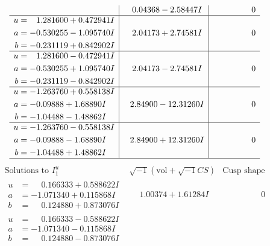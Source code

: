 \documentclass[1p]{elsarticle_modified}
\theoremstyle{definition}
\newcommand{\I}{\sqrt{-1}}
\begin{document}
$$\begin{array}{c|c|c}
 & \phantom{-}0.04368 - 2.58447 I & \phantom{-0.000000 } 0 \\ \hline\begin{aligned}
u &= \phantom{-}1.281600 + 0.472941 I \\
a &= -0.530255 - 1.095740 I \\
b &= -0.231119 + 0.842902 I\end{aligned}
 & \phantom{-}2.04173 + 2.74581 I & \phantom{-0.000000 } 0 \\ \hline\begin{aligned}
u &= \phantom{-}1.281600 - 0.472941 I \\
a &= -0.530255 + 1.095740 I \\
b &= -0.231119 - 0.842902 I\end{aligned}
 & \phantom{-}2.04173 - 2.74581 I & \phantom{-0.000000 } 0 \\ \hline\begin{aligned}
u &= -1.263760 + 0.558138 I \\
a &= -0.09888 + 1.68890 I \\
b &= -1.04488 - 1.48862 I\end{aligned}
 & \phantom{-}2.84900 - 12.31260 I & \phantom{-0.000000 } 0 \\ \hline\begin{aligned}
u &= -1.263760 - 0.558138 I \\
a &= -0.09888 - 1.68890 I \\
b &= -1.04488 + 1.48862 I\end{aligned}
 & \phantom{-}2.84900 + 12.31260 I & \phantom{-0.000000 } 0\\
 \hline 
 \end{array}$$\newpage$$\begin{array}{c|c|c}  
\text{Solutions to }I^u_{1}& \I (\text{vol} + \sqrt{-1}CS) & \text{Cusp shape}\\
 \hline 
\begin{aligned}
u &= \phantom{-}0.166333 + 0.588622 I \\
a &= -1.071340 + 0.115868 I \\
b &= \phantom{-}0.124880 + 0.873076 I\end{aligned}
 & \phantom{-}1.00374 + 1.61284 I & \phantom{-0.000000 } 0 \\ \hline\begin{aligned}
u &= \phantom{-}0.166333 - 0.588622 I \\
a &= -1.071340 - 0.115868 I \\
b &= \phantom{-}0.124880 - 0.873076 I\end{aligned}

\end{array}$$
\end{document}
